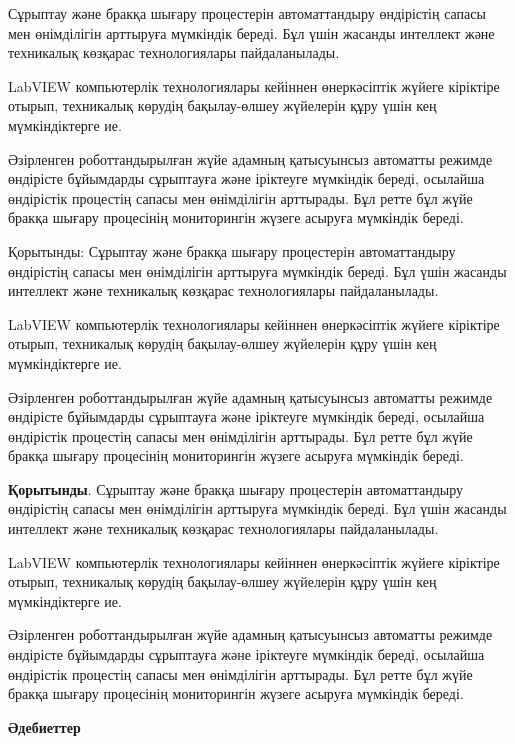 \begin{multicols}{2}
Сұрыптау және бракқа шығару процестерін автоматтандыру өндірістің сапасы
мен өнімділігін арттыруға мүмкіндік береді. Бұл үшін жасанды интеллект
және техникалық көзқарас технологиялары пайдаланылады.

LabVIEW компьютерлік технологиялары кейіннен өнеркәсіптік жүйеге
кіріктіре отырып, техникалық көрудің бақылау-өлшеу жүйелерін құру үшін
кең мүмкіндіктерге ие.

Әзірленген роботтандырылған жүйе адамның қатысуынсыз автоматты режимде
өндірісте бұйымдарды сұрыптауға және іріктеуге мүмкіндік береді,
осылайша өндірістік процестің сапасы мен өнімділігін арттырады. Бұл
ретте бұл жүйе бракқа шығару процесінің мониторингін жүзеге асыруға
мүмкіндік береді.

Қорытынды: Сұрыптау және бракқа шығару процестерін автоматтандыру
өндірістің сапасы мен өнімділігін арттыруға мүмкіндік береді. Бұл үшін
жасанды интеллект және техникалық көзқарас технологиялары пайдаланылады.

LabVIEW компьютерлік технологиялары кейіннен өнеркәсіптік жүйеге
кіріктіре отырып, техникалық көрудің бақылау-өлшеу жүйелерін құру үшін
кең мүмкіндіктерге ие.

Әзірленген роботтандырылған жүйе адамның қатысуынсыз автоматты режимде
өндірісте бұйымдарды сұрыптауға және іріктеуге мүмкіндік береді,
осылайша өндірістік процестің сапасы мен өнімділігін арттырады. Бұл
ретте бұл жүйе бракқа шығару процесінің мониторингін жүзеге асыруға
мүмкіндік береді.

{\bfseries Қорытынды}. Сұрыптау және бракқа шығару процестерін
автоматтандыру өндірістің сапасы мен өнімділігін арттыруға мүмкіндік
береді. Бұл үшін жасанды интеллект және техникалық көзқарас
технологиялары пайдаланылады.

LabVIEW компьютерлік технологиялары кейіннен өнеркәсіптік жүйеге
кіріктіре отырып, техникалық көрудің бақылау-өлшеу жүйелерін құру үшін
кең мүмкіндіктерге ие.

Әзірленген роботтандырылған жүйе адамның қатысуынсыз автоматты режимде
өндірісте бұйымдарды сұрыптауға және іріктеуге мүмкіндік береді,
осылайша өндірістік процестің сапасы мен өнімділігін арттырады. Бұл
ретте бұл жүйе бракқа шығару процесінің мониторингін жүзеге асыруға
мүмкіндік береді.
\end{multicols}

\begin{center}
{\bfseries Әдебиеттер}
\end{center}

